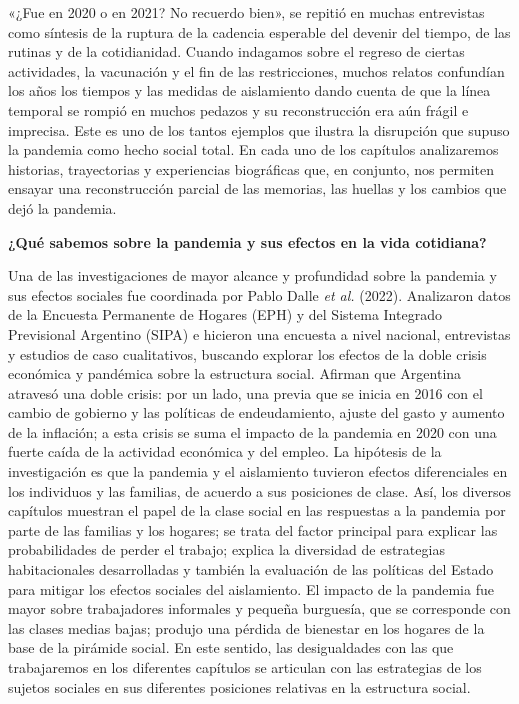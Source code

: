 «¿Fue en 2020 o en 2021? No recuerdo bien», se repitió en muchas entrevistas como síntesis de la ruptura de la cadencia esperable del devenir del tiempo, de las rutinas y de la cotidianidad. Cuando indagamos sobre el regreso de ciertas actividades, la vacunación y el fin de las restricciones, muchos relatos confundían los años los tiempos y las medidas de aislamiento dando cuenta de que la línea temporal se rompió en muchos pedazos y su reconstrucción era aún frágil e imprecisa. Este es uno de los tantos ejemplos que ilustra la disrupción que supuso la pandemia como hecho social total. En cada uno de los capítulos analizaremos historias, trayectorias y experiencias biográficas que, en conjunto, nos permiten ensayar una reconstrucción parcial de las memorias, las huellas y los cambios que dejó la pandemia.

\textbf{¿Qué sabemos sobre la pandemia y sus efectos en la vida cotidiana?}

Una de las investigaciones de mayor alcance y profundidad sobre la pandemia y sus efectos sociales fue coordinada por Pablo Dalle \emph{et al.} (2022). Analizaron datos de la Encuesta Permanente de Hogares (EPH) y del Sistema Integrado Previsional Argentino (SIPA) e hicieron una encuesta a nivel nacional, entrevistas y estudios de caso cualitativos, buscando explorar los efectos de la doble crisis económica y pandémica sobre la estructura social. Afirman que Argentina atravesó una doble crisis: por un lado, una previa que se inicia en 2016 con el cambio de gobierno y las políticas de endeudamiento, ajuste del gasto y aumento de la inflación; a esta crisis se suma el impacto de la pandemia en 2020 con una fuerte caída de la actividad económica y del empleo. La hipótesis de la investigación es que la pandemia y el aislamiento tuvieron efectos diferenciales en los individuos y las familias, de acuerdo a sus posiciones de clase. Así, los diversos capítulos muestran el papel de la clase social en las respuestas a la pandemia por parte de las familias y los hogares; se trata del factor principal para explicar las probabilidades de perder el trabajo; explica la diversidad de estrategias habitacionales desarrolladas y también la evaluación de las políticas del Estado para mitigar los efectos sociales del aislamiento. El impacto de la pandemia fue mayor sobre trabajadores informales y pequeña burguesía, que se corresponde con las clases medias bajas; produjo una pérdida de bienestar en los hogares de la base de la pirámide social. En este sentido, las desigualdades con las que trabajaremos en los diferentes capítulos se articulan con las estrategias de los sujetos sociales en sus diferentes posiciones relativas en la estructura social.

